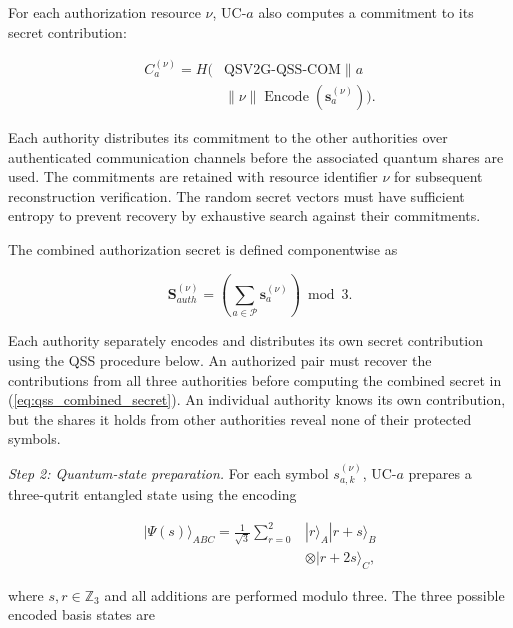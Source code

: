 \documentclass[twocolumn,10pt,journal]{IEEEtran}
\begin{document}
For each authorization resource $\nu$, UC-$a$
also computes a commitment to its secret
contribution:

\begin{equation}
\begin{aligned}
C_a^{(\nu)}
=
H\big(
&\mathrm{QSV2G\mbox{-}QSS\mbox{-}COM}
\parallel a\\
&\parallel\nu
\parallel
\operatorname{Encode}
(\mathbf{s}_a^{(\nu)})
\big).
\end{aligned}
\label{eq:qsv2g_qss_commitment}
\end{equation}

Each authority distributes its commitment
to the other authorities over authenticated
communication channels before the associated
quantum shares are used. The commitments are
retained with resource identifier $\nu$ for
subsequent reconstruction verification.
The random secret vectors must have sufficient
entropy to prevent recovery by exhaustive
search against their commitments.

The combined authorization secret is
defined componentwise as

\begin{equation}
\mathbf{S}_{auth}^{(\nu)}
=
\left(
\sum_{a\in\mathcal{P}}
\mathbf{s}_{a}^{(\nu)}
\right)\bmod 3.
\label{eq:qss_combined_secret}
\end{equation}

Each authority separately encodes and distributes its
own secret contribution using the QSS procedure below.
An authorized pair must recover the contributions from
all three authorities before computing the combined
secret in (\ref{eq:qss_combined_secret}). An individual
authority knows its own contribution, but the shares it
holds from other authorities reveal none of their
protected symbols.

\textit{Step 2: Quantum-state preparation.}
For each symbol $s_{a,k}^{(\nu)}$, UC-$a$
prepares a three-qutrit entangled state using
the encoding

\begin{equation}
\begin{aligned}
|\Psi(s)\rangle_{ABC}
=
\frac{1}{\sqrt{3}}
\sum_{r=0}^{2}
&|r\rangle_A
|r+s\rangle_B\\
&\otimes |r+2s\rangle_C,
\end{aligned}
\label{eq:qss_qutrit_encoding}
\end{equation}

where $s,r\in\mathbb{Z}_3$ and all additions
are performed modulo three. The three possible
encoded basis states are
\end{document}
